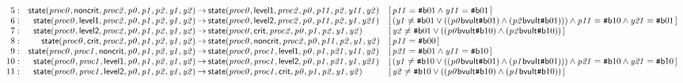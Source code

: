 \documentclass[a4paper]{article}
\newcommand{\ttsym}[1]{\mbox{\tt #1}}
\def\ttsharp{\ttsym{\symbol{35}}}
\newcommand{\symb}[1]{\mathsf{#1}}
\newcommand{\var}[1]{\mathit{#1}}
\newcommand{\Constraint}[1]{[\, #1 \,]}
\newcommand{\bv}[2][b]{{\ttsharp\symb{#1}{#2}}}
\begin{document}
\begin{landscape}
\[\begin{array}{rr@{\>}c@{\>}ll}
\mathrm{5} : 
 & \symb{state}(\var{proc0},\symb{noncrit},\var{proc2},\var{p0},\var{p1},\var{p2},\var{y1},\var{y2})
 & \to 
 & \symb{state}(\var{proc0},\symb{level1},\var{proc2},\var{p0},\var{p11},\var{p2},\var{y11},\var{y2})
 & \Constraint{\var{p11} = \bv{01} \land \var{y11} = \bv{01}}\\

\mathrm{6} : 
 & \symb{state}(\var{proc0},\symb{level1},\var{proc2},\var{p0},\var{p1},\var{p2},\var{y1},\var{y2})
 & \to 
 & \symb{state}(\var{proc0},\symb{level2},\var{proc2},\var{p0},\var{p11},\var{p2},\var{y1},\var{y21})
 & \Constraint{(\var{y1} \ne \bv{01} \lor ((\var{p0} \symb{bvult} \bv{01}) \land (\var{p2} \symb{bvult} \bv{01}))) \land \var{p11} = \bv{10} \land \var{y21} = \bv{01}}\\

\mathrm{7} : 
 & \symb{state}(\var{proc0},\symb{level2},\var{proc2},\var{p0},\var{p1},\var{p2},\var{y1},\var{y2})
 & \to 
 & \symb{state}(\var{proc0},\symb{crit},\var{proc2},\var{p0},\var{p1},\var{p2},\var{y1},\var{y2})
 & \Constraint{\var{y2} \ne \bv{01} \lor ((\var{p0} \symb{bvult} \bv{10}) \land (\var{p2} \symb{bvult} \bv{10}))}\\

\mathrm{8} : 
 & \symb{state}(\var{proc0},\symb{crit},\var{proc2},\var{p0},\var{p1},\var{p2},\var{y1},\var{y2})
 & \to 
 & \symb{state}(\var{proc0},\symb{noncrit},\var{proc2},\var{p0},\var{p11},\var{p2},\var{y1},\var{y2})
 & \Constraint{\var{p11} = \bv{00}}\\

\mathrm{9} : 
 & \symb{state}(\var{proc0},\var{proc1},\symb{noncrit},\var{p0},\var{p1},\var{p2},\var{y1},\var{y2})
 & \to 
 & \symb{state}(\var{proc0},\var{proc1},\symb{level1},\var{p0},\var{p1},\var{p21},\var{y11},\var{y2})
 & \Constraint{\var{p21} = \bv{01} \land \var{y11} = \bv{10}}\\

\mathrm{10} : 
 & \symb{state}(\var{proc0},\var{proc1},\symb{level1},\var{p0},\var{p1},\var{p2},\var{y1},\var{y2})
 & \to 
 & \symb{state}(\var{proc0},\var{proc1},\symb{level2},\var{p0},\var{p1},\var{p21},\var{y1},\var{y21})
 & \Constraint{(\var{y1} \ne \bv{10} \lor ((\var{p0} \symb{bvult} \bv{01}) \land (\var{p1} \symb{bvult} \bv{01}))) \land \var{p21} = \bv{10} \land \var{y21} = \bv{10}}\\

\mathrm{11} : 
 & \symb{state}(\var{proc0},\var{proc1},\symb{level2},\var{p0},\var{p1},\var{p2},\var{y1},\var{y2})
 & \to 
 & \symb{state}(\var{proc0},\var{proc1},\symb{crit},\var{p0},\var{p1},\var{p2},\var{y1},\var{y2})
 & \Constraint{\var{y2} \ne \bv{10} \lor ((\var{p0} \symb{bvult} \bv{10}) \land (\var{p1} \symb{bvult} \bv{10}))}\\


\end{array}\]
\end{landscape}
\end{document}
